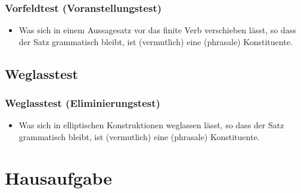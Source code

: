 \begin{frame}
\frametitle{Vorfeldtest (Voranstellungstest)}

\begin{itemize}
	\item Was sich in einem Aussagesatz vor das finite Verb verschieben lässt, so dass der Satz grammatisch bleibt, ist (vermutlich) eine (phrasale) Konstituente.

	\eal 
	\zl

\end{itemize}

\end{frame}


\subsection{Weglasstest}

\begin{frame}
\frametitle{Weglasstest (Eliminierungstest)}

\begin{itemize}
	\item Was sich in elliptischen Konstruktionen weglassen lässt, so dass der Satz grammatisch bleibt, ist (vermutlich) eine (phrasale) Konstituente.

	\eal 
	\zl

\end{itemize}

\end{frame}


\section{Hausaufgabe}

